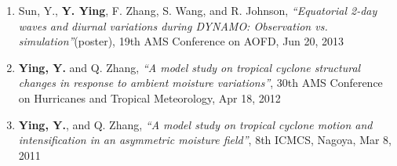 \begin{enumerate}
\item Sun, Y., \textbf{Y. Ying}, F. Zhang, S. Wang, and R. Johnson,
\textit{``Equatorial 2-day waves and diurnal variations during DYNAMO: Observation vs. simulation''}(poster),
19th AMS Conference on AOFD, Jun 20, 2013

\item \textbf{Ying, Y.} and Q. Zhang,
\textit{``A model study on tropical cyclone structural changes in response to ambient moisture variations''},
30th AMS Conference on Hurricanes and Tropical Meteorology, Apr 18, 2012

\item \textbf{Ying, Y.}, and Q. Zhang,
\textit{``A model study on tropical cyclone motion and intensification in an asymmetric moisture field''},
8th ICMCS, Nagoya, Mar 8, 2011

\end{enumerate}
